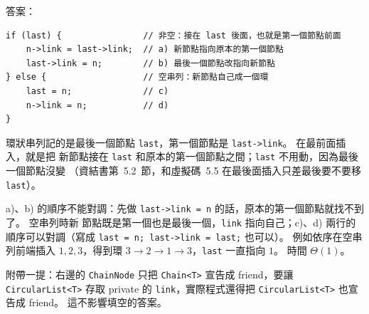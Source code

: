 \begin{pastsoln}
答案：
\begin{verbatim}
if (last) {                // 非空：接在 last 後面，也就是第一個節點前面
    n->link = last->link;  // a) 新節點指向原本的第一個節點
    last->link = n;        // b) 最後一個節點改指向新節點
} else {                   // 空串列：新節點自己成一個環
    last = n;              // c)
    n->link = n;           // d)
}
\end{verbatim}

環狀串列記的是最後一個節點 \texttt{last}，第一個節點是 \texttt{last->link}。 在最前面插入，就是把
新節點接在 \texttt{last} 和原本的第一個節點之間；\texttt{last} 不用動，因為最後一個節點沒變
（資結書第~5.2~節，和虛擬碼~5.5 在最後面插入只差最後要不要移 \texttt{last}）。

a)、b) 的順序不能對調：先做 \texttt{last->link = n} 的話，原本的第一個節點就找不到了。 空串列時新
節點既是第一個也是最後一個，\texttt{link} 指向自己；c)、d) 兩行的順序可以對調（寫成
\texttt{last = n; last->link = last;} 也可以）。 例如依序在空串列前端插入 $1, 2, 3$，得到環
$3 \to 2 \to 1 \to 3$，\texttt{last} 一直指向 $1$。 時間 $\Theta(1)$。

附帶一提：右邊的 \texttt{ChainNode} 只把 \texttt{Chain<T>} 宣告成 friend，要讓
\texttt{CircularList<T>} 存取 private 的 \texttt{link}，實際程式還得把 \texttt{CircularList<T>}
也宣告成 friend。 這不影響填空的答案。
\end{pastsoln}
